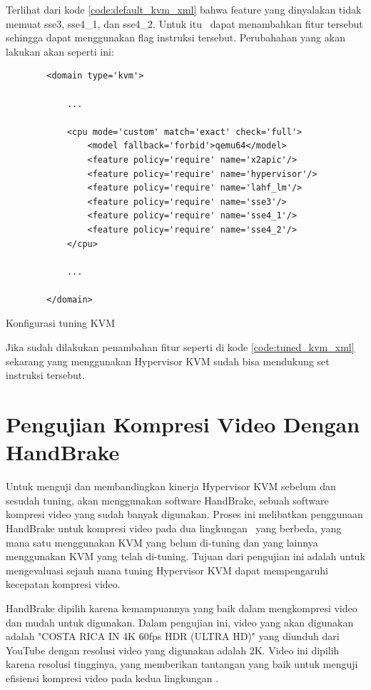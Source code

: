 Terlihat dari kode \ref{code:default_kvm_xml} bahwa feature yang dinyalakan tidak memuat sse3, sse4\_1, dan sse4\_2. Untuk itu \saya\ dapat menambahkan fitur tersebut sehingga \vm dapat menggunakan flag instruksi tersebut. Perubahahan yang akan \saya lakukan akan seperti ini:

\begin{listing}[H]
	\begin{verbatim}
		<domain type='kvm'>
		
			...
			
			<cpu mode='custom' match='exact' check='full'>
				<model fallback='forbid'>qemu64</model>
				<feature policy='require' name='x2apic'/>
				<feature policy='require' name='hypervisor'/>
				<feature policy='require' name='lahf_lm'/>
				<feature policy='require' name='sse3'/>
				<feature policy='require' name='sse4_1'/>
				<feature policy='require' name='sse4_2'/>
			</cpu>
			
			...
			
		</domain>
	\end{verbatim}
	\caption{Konfigurasi tuning KVM}
	\label{code:tuned_kvm_xml}
\end{listing}

Jika sudah dilakukan penambahan fitur seperti di kode \ref{code:tuned_kvm_xml} sekarang \vm yang menggunakan Hypervisor KVM sudah bisa mendukung set instruksi tersebut.

\section{Pengujian Kompresi Video Dengan HandBrake}
Untuk menguji dan membandingkan kinerja Hypervisor KVM sebelum dan sesudah tuning, {\saya} akan menggunakan software HandBrake, sebuah software kompresi video yang sudah banyak digunakan. Proses ini melibatkan penggunaan HandBrake untuk kompresi video pada dua lingkungan \vm\ yang berbeda, yang mana satu menggunakan KVM yang belum di-tuning dan yang lainnya menggunakan KVM yang telah di-tuning. Tujuan dari pengujian ini adalah untuk mengevaluasi sejauh mana tuning Hypervisor KVM dapat mempengaruhi kecepatan kompresi video.

HandBrake dipilih karena kemampuannya yang baik dalam mengkompresi video dan mudah untuk digunakan\cite{Folgar2014-eg}. Dalam pengujian ini, video yang akan digunakan adalah "COSTA RICA IN 4K 60fps HDR (ULTRA HD)" yang diunduh dari YouTube dengan resolusi video yang digunakan adalah 2K. Video ini dipilih karena resolusi tingginya, yang memberikan tantangan yang baik untuk menguji efisiensi kompresi video pada kedua lingkungan \vm. 

